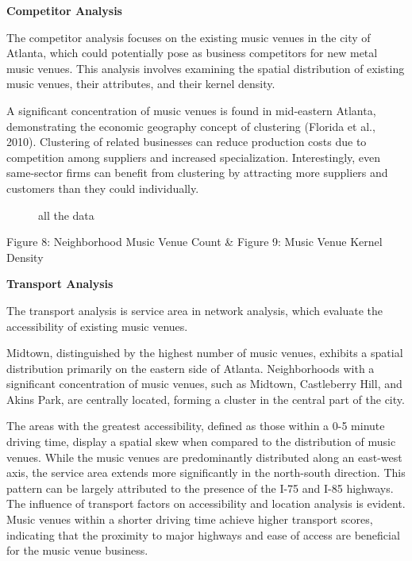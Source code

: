 \documentclass[11pt]{article}
\begin{document}
\textbf{Competitor Analysis}

The competitor analysis focuses on the existing music venues in the city of Atlanta, which could potentially pose as business competitors for new metal music venues. This analysis involves examining the spatial distribution of existing music venues, their attributes, and their kernel density.

A significant concentration of music venues is found in mid-eastern Atlanta, demonstrating the economic geography concept of clustering (Florida et al., 2010). Clustering of related businesses can reduce production costs due to competition among suppliers and increased specialization. Interestingly, even same-sector firms can benefit from clustering by attracting more suppliers and customers than they could individually.

\begin{figure}[H] 
    \centering
    \hfill%
    \caption{all the data}
\end{figure}


\begin{center}
\centering
Figure 8: Neighborhood Music Venue Count \& Figure 9: Music Venue Kernel Density
\end{center}



\textbf{Transport Analysis}

The transport analysis is service area in network analysis, which evaluate the accessibility of existing music venues. 

Midtown, distinguished by the highest number of music venues, exhibits a spatial distribution primarily on the eastern side of Atlanta. Neighborhoods with a significant concentration of music venues, such as Midtown, Castleberry Hill, and Akins Park, are centrally located, forming a cluster in the central part of the city.

The areas with the greatest accessibility, defined as those within a 0-5 minute driving time, display a spatial skew when compared to the distribution of music venues. While the music venues are predominantly distributed along an east-west axis, the service area extends more significantly in the north-south direction. This pattern can be largely attributed to the presence of the I-75 and I-85 highways. The influence of transport factors on accessibility and location analysis is evident. Music venues within a shorter driving time achieve higher transport scores, indicating that the proximity to major highways and ease of access are beneficial for the music venue business.
\end{document}
